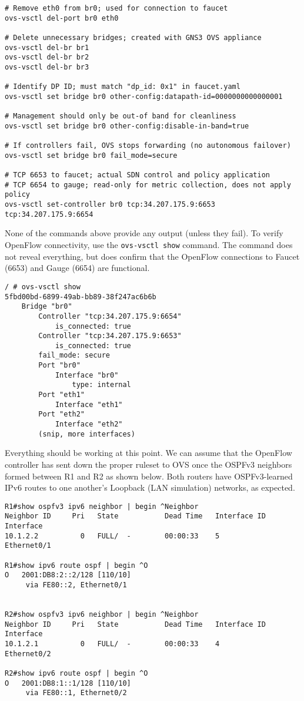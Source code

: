 \begin{verbatim}
# Remove eth0 from br0; used for connection to faucet
ovs-vsctl del-port br0 eth0

# Delete unnecessary bridges; created with GNS3 OVS appliance
ovs-vsctl del-br br1
ovs-vsctl del-br br2
ovs-vsctl del-br br3

# Identify DP ID; must match "dp_id: 0x1" in faucet.yaml
ovs-vsctl set bridge br0 other-config:datapath-id=0000000000000001

# Management should only be out-of band for cleanliness
ovs-vsctl set bridge br0 other-config:disable-in-band=true

# If controllers fail, OVS stops forwarding (no autonomous failover)
ovs-vsctl set bridge br0 fail_mode=secure

# TCP 6653 to faucet; actual SDN control and policy application
# TCP 6654 to gauge; read-only for metric collection, does not apply policy
ovs-vsctl set-controller br0 tcp:34.207.175.9:6653 tcp:34.207.175.9:6654
\end{verbatim}

None of the commands above provide any output (unless they fail). To
verify OpenFlow connectivity, use the \verb|ovs-vsctl show| command.
The command does not reveal everything, but does confirm that
the OpenFlow connections to Faucet (6653) and Gauge (6654) are functional.

\begin{verbatim}
/ # ovs-vsctl show
5fbd00bd-6899-49ab-bb89-38f247ac6b6b
    Bridge "br0"
        Controller "tcp:34.207.175.9:6654"
            is_connected: true
        Controller "tcp:34.207.175.9:6653"
            is_connected: true
        fail_mode: secure
        Port "br0"
            Interface "br0"
                type: internal
        Port "eth1"
            Interface "eth1"
        Port "eth2"
            Interface "eth2"
        (snip, more interfaces)
\end{verbatim}

Everything should be working at this point. We can assume that the OpenFlow
controller has sent down the proper ruleset to OVS once the OSPFv3 neighbors
formed between R1 and R2 as shown below. Both routers have OSPFv3-learned IPv6
routes to one another's Loopback (LAN simulation) networks, as expected.

\begin{verbatim}
R1#show ospfv3 ipv6 neighbor | begin ^Neighbor
Neighbor ID     Pri   State           Dead Time   Interface ID    Interface
10.1.2.2          0   FULL/  -        00:00:33    5               Ethernet0/1

R1#show ipv6 route ospf | begin ^O
O   2001:DB8:2::2/128 [110/10]
     via FE80::2, Ethernet0/1


R2#show ospfv3 ipv6 neighbor | begin ^Neighbor
Neighbor ID     Pri   State           Dead Time   Interface ID    Interface
10.1.2.1          0   FULL/  -        00:00:33    4               Ethernet0/2

R2#show ipv6 route ospf | begin ^O
O   2001:DB8:1::1/128 [110/10]
     via FE80::1, Ethernet0/2
\end{verbatim}

